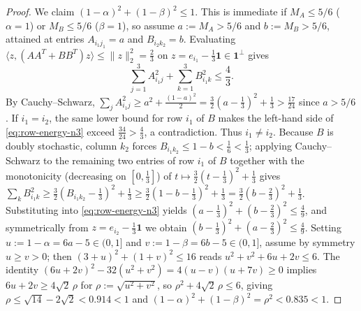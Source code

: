 \documentclass[11pt,a4paper]{article}
\theoremstyle{definition}
\newcommand{\one}{\mathbf{1}}
\begin{document}
\begin{proof}
We claim $(1-\alpha)^2 + (1-\beta)^2 \le 1$. This is immediate if $M_A \le 5/6$ ($\alpha = 1$) or $M_B \le 5/6$ ($\beta = 1$), so assume $a := M_A > 5/6$ and $b := M_B > 5/6$, attained at entries $A_{i_1 j_1} = a$ and $B_{i_2 k_2} = b$. Evaluating $\langle z, (AA^T + BB^T)z\rangle \le \|z\|_2^2 = \frac{2}{3}$ on $z = e_{i_1} - \frac{1}{3}\one \in \one^\perp$ gives
\begin{equation}
\label{eq:row-energy-n3}
\sum_{j=1}^3 A_{i_1 j}^2 + \sum_{k=1}^3 B_{i_1 k}^2 \le \frac{4}{3}.
\end{equation}
By Cauchy--Schwarz, $\sum_j A_{i_1 j}^2 \ge a^2 + \frac{(1-a)^2}{2} = \frac{3}{2}(a-\frac{1}{3})^2 + \frac{1}{3} > \frac{17}{24}$ since $a > 5/6$. If $i_1 = i_2$, the same lower bound for row $i_1$ of $B$ makes the left-hand side of \eqref{eq:row-energy-n3} exceed $\frac{34}{24} > \frac{4}{3}$, a contradiction. Thus $i_1 \neq i_2$. Because $B$ is doubly stochastic, column $k_2$ forces $B_{i_1 k_2} \le 1 - b < \frac{1}{6} < \frac{1}{3}$; applying Cauchy--Schwarz to the remaining two entries of row $i_1$ of $B$ together with the monotonicity (decreasing on $[0, \frac{1}{3}]$) of $t \mapsto \frac{3}{2}(t-\frac{1}{3})^2 + \frac{1}{3}$ gives $\sum_k B_{i_1 k}^2 \ge \frac{3}{2}(B_{i_1 k_2}-\frac{1}{3})^2 + \frac{1}{3} \ge \frac{3}{2}(1-b-\frac{1}{3})^2 + \frac{1}{3} = \frac{3}{2}(b-\frac{2}{3})^2 + \frac{1}{3}$. Substituting into \eqref{eq:row-energy-n3} yields $(a-\frac{1}{3})^2 + (b-\frac{2}{3})^2 \le \frac{4}{9}$, and symmetrically from $z = e_{i_2} - \frac{1}{3}\one$ we obtain $(b-\frac{1}{3})^2 + (a-\frac{2}{3})^2 \le \frac{4}{9}$. Setting $u := 1-\alpha = 6a-5 \in (0,1]$ and $v := 1-\beta = 6b-5 \in (0,1]$, assume by symmetry $u \ge v > 0$; then $(3+u)^2 + (1+v)^2 \le 16$ reads $u^2 + v^2 + 6u + 2v \le 6$. The identity $(6u + 2v)^2 - 32(u^2 + v^2) = 4(u-v)(u+7v) \ge 0$ implies $6u + 2v \ge 4\sqrt{2}\,\rho$ for $\rho := \sqrt{u^2 + v^2}$, so $\rho^2 + 4\sqrt{2}\,\rho \le 6$, giving $\rho \le \sqrt{14} - 2\sqrt{2} < 0.914 < 1$ and $(1-\alpha)^2 + (1-\beta)^2 = \rho^2 < 0.835 < 1$.


\end{proof}
\end{document}
